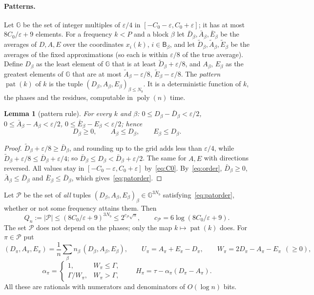 \documentclass[11pt]{article}
\newtheorem{lemma}{Lemma}[section]
\theoremstyle{definition}
\newcommand{\eps}{\varepsilon}
\newcommand{\abs}[1]{\lvert #1\rvert}
\newcommand{\poly}{\operatorname{poly}}
\newcommand{\cP}{\mathcal P}
\newcommand{\pat}{\operatorname{pat}}
\begin{document}
\paragraph{Patterns.} Let $\mathbb G$ be the set of integer multiples of $\eps/4$ in $[-C_0-\eps,C_0+\eps]$; it has at
most $8C_0/\eps+9$ elements. For a frequency $k<P$ and a block $\beta$ let $\bar D_\beta,\bar A_\beta,\bar E_\beta$ be the
averages of $D,A,E$ over the coordinates $x_i(k)$, $i\in\mathsf B_\beta$, and let
$\tilde D_\beta,\tilde A_\beta,\tilde E_\beta$ be the averages of the fixed approximations (so each is within $\eps/8$ of
the true average). Define $D_\beta$ as the least element of $\mathbb G$ that is at least $\tilde D_\beta+\eps/8$, and
$A_\beta$, $E_\beta$ as the greatest elements of $\mathbb G$ that are at most $\tilde A_\beta-\eps/8$,
$\tilde E_\beta-\eps/8$. The \emph{pattern} $\pat(k)$ of $k$ is the tuple $(D_\beta,A_\beta,E_\beta)_{\beta\le N_b}$. It is a
deterministic function of $k$, the phases and the residues, computable in $\poly(n)$ time.

\begin{lemma}[pattern rule]\label{lem:pattern}
For every $k$ and $\beta$: $0\le D_\beta-\bar D_\beta<\eps/2$, $0\le\bar A_\beta-A_\beta<\eps/2$,
$0\le\bar E_\beta-E_\beta<\eps/2$; hence
\begin{equation}\label{eq:patorder}
 D_\beta\ge0,\qquad A_\beta\le D_\beta,\qquad E_\beta\le D_\beta .
\end{equation}
\end{lemma}
\begin{proof}
$\tilde D_\beta+\eps/8\ge\bar D_\beta$, and rounding up to the grid adds less than $\eps/4$, while
$\tilde D_\beta+\eps/8\le\bar D_\beta+\eps/4$; so $\bar D_\beta\le D_\beta<\bar D_\beta+\eps/2$. The same for $A,E$ with
directions reversed. All values stay in $[-C_0-\eps,C_0+\eps]$ by~\eqref{eq:C0}. By~\eqref{eq:order},
$\bar D_\beta\ge0$, $\bar A_\beta\le\bar D_\beta$ and $\bar E_\beta\le\bar D_\beta$, which gives~\eqref{eq:patorder}.
\end{proof}
Let $\cP$ be the set of \emph{all} tuples $(D_\beta,A_\beta,E_\beta)_\beta\in\mathbb G^{3N_b}$
satisfying~\eqref{eq:patorder}, whether or not some frequency attains them. Then
\begin{equation}\label{eq:Qn}
 Q_n:=\abs\cP\le(8C_0/\eps+9)^{3N_b}\le2^{c_{\cP}\sqrt n},\qquad c_{\cP}=6\log(8C_0/\eps+9).
\end{equation}
The set $\cP$ does not depend on the phases; only the map $k\mapsto\pat(k)$ does. For $\pi\in\cP$ put
\[
 (D_\pi,A_\pi,E_\pi)=\frac1n\sum_\beta n_\beta\,(D_\beta,A_\beta,E_\beta),\qquad U_\pi=A_\pi+E_\pi-D_\pi,\qquad
 W_\pi=2D_\pi-A_\pi-E_\pi\ \ (\ge0),
\]
\begin{equation}\label{eq:alpha}
 \alpha_\pi=\begin{cases}1,&W_\pi\le\Gamma,\\ \Gamma/W_\pi,&W_\pi>\Gamma,\end{cases}\qquad
 H_\pi=\tau-\alpha_\pi(D_\pi-A_\pi).
\end{equation}
All these are rationals with numerators and denominators of $O(\log n)$ bits.
\end{document}
